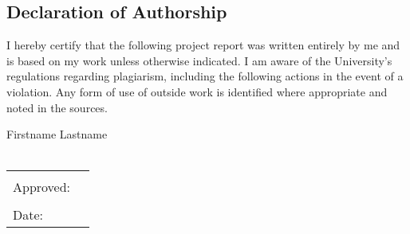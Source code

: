 \begin{center}
\section*{Declaration of Authorship}
\end{center}

\noindent I hereby certify that the following project report was written entirely by me and is based on my work unless otherwise indicated. I am aware of the University's regulations regarding plagiarism, including the following actions in the event of a violation. Any form of use of outside work is identified where appropriate and noted in the sources.

\vspace{1cm}

\begin{center}
\large
Firstname Lastname\\~\\
\end{center}

\begin{tabular}{p{5cm}p{10cm}}
& \\
Approved: & \hrulefill \\
& \\
Date: & \hrulefill \\
\end{tabular}